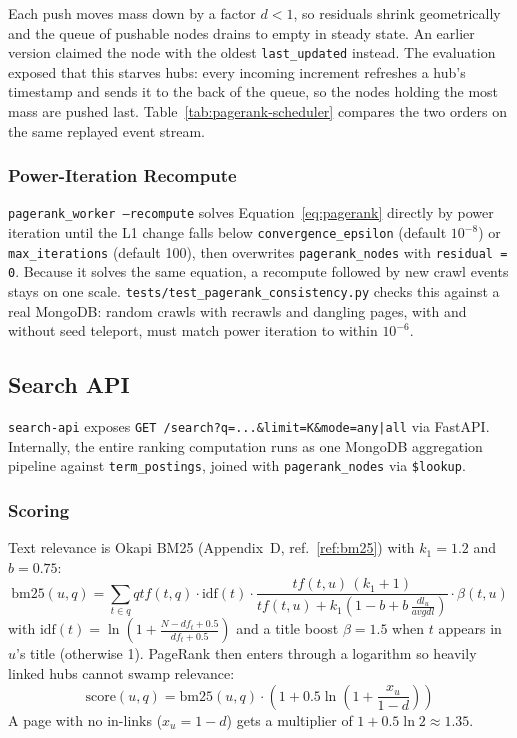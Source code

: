 \documentclass[11pt,a4paper]{article}
\newcommand{\code}[1]{\texttt{#1}}
\begin{document}
Each push moves mass down by a factor $d < 1$, so residuals shrink geometrically and the queue of pushable nodes drains to empty in steady state. An earlier version claimed the node with the oldest \code{last\_updated} instead. The evaluation exposed that this starves hubs: every incoming increment refreshes a hub's timestamp and sends it to the back of the queue, so the nodes holding the most mass are pushed last. Table~\ref{tab:pagerank-scheduler} compares the two orders on the same replayed event stream.

\subsubsection{Power-Iteration Recompute}

\code{pagerank\_worker --recompute} solves Equation~\ref{eq:pagerank} directly by power iteration until the L1 change falls below \code{convergence\_epsilon} (default $10^{-8}$) or \code{max\_iterations} (default 100), then overwrites \code{pagerank\_nodes} with \code{residual = 0}. Because it solves the same equation, a recompute followed by new crawl events stays on one scale. \code{tests/test\_pagerank\_consistency.py} checks this against a real MongoDB: random crawls with recrawls and dangling pages, with and without seed teleport, must match power iteration to within $10^{-6}$.

\subsection{Search API}
\label{sec:search}

\code{search-api} exposes \code{GET /search?q=...\&limit=K\&mode=any|all} via FastAPI. Internally, the entire ranking computation runs as one MongoDB aggregation pipeline against \code{term\_postings}, joined with \code{pagerank\_nodes} via \code{\$lookup}.

\subsubsection{Scoring}

Text relevance is Okapi BM25 (Appendix~D, ref.~\ref{ref:bm25}) with $k_1 = 1.2$ and $b = 0.75$:
\begin{equation}
\text{bm25}(u, q) = \sum_{t \in q} qtf(t,q) \cdot \text{idf}(t) \cdot \frac{tf(t,u)\,(k_1+1)}{tf(t,u) + k_1\left(1 - b + b\,\frac{dl_u}{avgdl}\right)} \cdot \beta(t,u)
\end{equation}
with $\text{idf}(t) = \ln\!\left(1 + \frac{N - df_t + 0.5}{df_t + 0.5}\right)$ and a title boost $\beta = 1.5$ when $t$ appears in $u$'s title (otherwise 1). PageRank then enters through a logarithm so heavily linked hubs cannot swamp relevance:
\begin{equation}
\text{score}(u, q) = \text{bm25}(u, q) \cdot \left(1 + 0.5 \ln\!\left(1 + \frac{x_u}{1-d}\right)\right)
\end{equation}
A page with no in-links ($x_u = 1-d$) gets a multiplier of $1 + 0.5\ln 2 \approx 1.35$.
\end{document}

